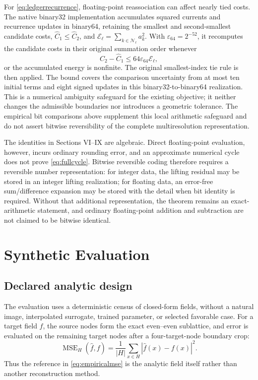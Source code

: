 \documentclass[journal]{IEEEtran}
\begin{document}
For \eqref{eq:ledgerrecurrence}, floating-point reassociation can affect
nearly tied costs. The native binary32 implementation accumulates squared
currents and recurrence updates in binary64, retaining the smallest and
second-smallest candidate costs, \(\widehat C_1\leq\widehat C_2\), and
\(\mathcal E_\ell=\sum_{k\in\mathcal N_\ell}a_k^2\). With
\(\varepsilon_{64}=2^{-52}\), it recomputes the candidate costs in their
original summation order whenever
\begin{equation}
 \widehat C_2-\widehat C_1
 \leq64\varepsilon_{64}\mathcal E_\ell,
 \label{eq:ledgertieguard}
\end{equation}
or the accumulated energy is nonfinite. The original smallest-index tie
rule is then applied. The bound covers the comparison uncertainty from
at most ten initial terms and eight signed updates in this binary32-to-binary64
realization. This is a numerical ambiguity safeguard for the existing
objective; it neither changes the admissible boundaries nor introduces a
geometric tolerance. The empirical bit comparisons above supplement this
local arithmetic safeguard and do not assert bitwise reversibility of the
complete multiresolution representation.


The identities in Sections VI--IX are algebraic. Direct floating-point
evaluation, however, incurs ordinary rounding error, and an approximate
numerical cycle does not prove \eqref{eq:fullcycle}. Bitwise reversible coding
therefore requires a reversible number representation: for integer data, the
lifting residual may be stored in an integer lifting realization; for
floating data, an error-free sum/difference expansion may be stored with the
detail when bit identity is required. Without that additional representation,
the theorem remains an exact-arithmetic statement, and ordinary
floating-point addition and subtraction are not claimed to be bitwise
identical.

\raggedbottom
\section{Synthetic Evaluation}

\subsection{Declared analytic design}

The evaluation uses a deterministic census of closed-form fields, without a
natural image, interpolated surrogate, trained parameter, or selected
favorable case. For a target field $f$, the source nodes form the exact
even--even sublattice, and error is evaluated on the remaining target nodes
after a four-target-node boundary crop:
\begin{equation}
 \operatorname{MSE}_{H}(\widehat f,f)
 =\frac{1}{|H|}\sum_{x\in H}|\widehat f(x)-f(x)|^2.
 \label{eq:empiricalmse}
\end{equation}
Thus the reference in \eqref{eq:empiricalmse} is the analytic field itself
rather than another reconstruction method.
\end{document}
